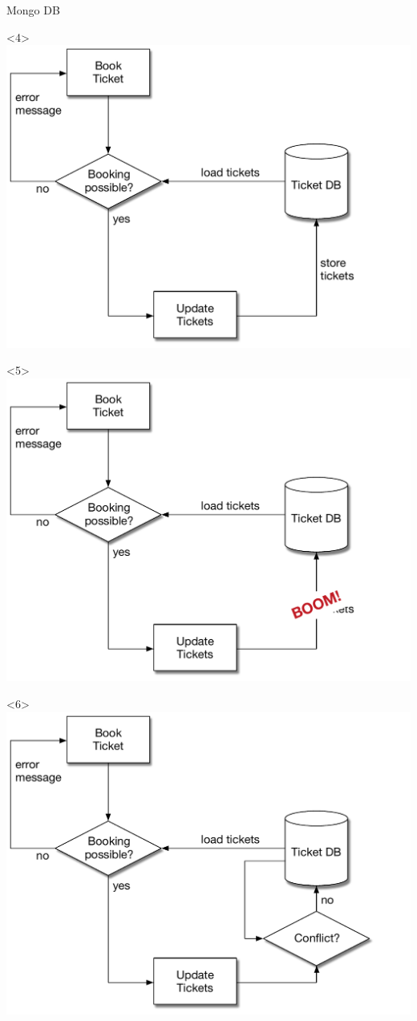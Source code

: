 \begin{frame}[fragile]{Mongo DB}
\begin{center}
\begin{onlyenv}<4>
\includegraphics[width=.85\textwidth]{../OptimisticLocking4.pdf}
\end{onlyenv}

\begin{onlyenv}<5>
\includegraphics[width=.85\textwidth]{../OptimisticLocking5.pdf}
\end{onlyenv}


\begin{onlyenv}<6>
\includegraphics[width=.85\textwidth]{../OptimisticLocking6.pdf}
\end{onlyenv}


\end{center}
\end{frame}
